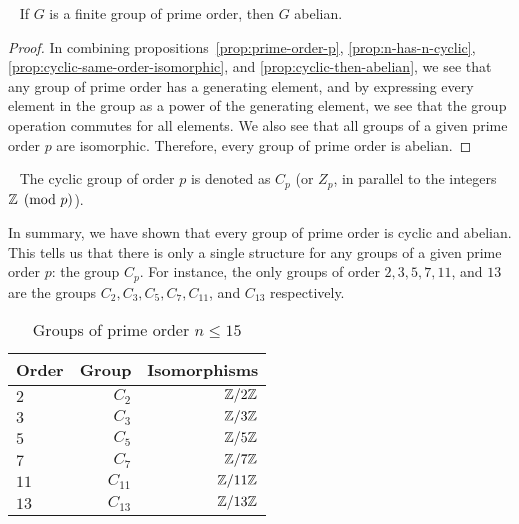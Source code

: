 \begin{corollary}~\label{cor:prime-then-abelian}
  If $G$ is a finite group of prime order, then $G$ abelian.
  \begin{proof}
    In combining propositions~\ref{prop:prime-order-p}, \ref{prop:n-has-n-cyclic},
    \ref{prop:cyclic-same-order-isomorphic}, and \ref{prop:cyclic-then-abelian},
    we see that any group of prime order has a generating element,
    and by expressing every element in the group as a power of the generating element,
    we see that the group operation commutes for all elements.
    We also see that all groups of a given prime order $p$ are isomorphic.
    Therefore, every group of prime order is abelian.
  \end{proof}
\end{corollary}

\begin{definition}~\label{def:C_n}
  The cyclic group of order $p$ is denoted as $C_p$ (or $Z_p$,
  in parallel to the integers $\mathbb{Z} \pmod p$).
\end{definition}

In summary, we have shown that every group of prime order is
cyclic and abelian. This tells us that there is only a single
structure for any groups of a given prime order $p$: the group $C_p$.
For instance, the only groups of order $2, 3, 5, 7, 11$, and $13$
are the groups $C_2, C_3, C_5, C_7, C_{11}$, and $C_{13}$ respectively.

\bigskip

\begin{center}
  \begin{table}[H]
    \begin{tabular}{ l r r }
      Order & Group & Isomorphisms \\
      \midrule
      $2$ & $C_2$ & $\mathbb{Z}/2\mathbb{Z}$ \\
      $3$ & $C_3$ & $\mathbb{Z}/3\mathbb{Z}$ \\
      $5$ & $C_5$ & $\mathbb{Z}/5\mathbb{Z}$ \\
      $7$ & $C_7$ & $\mathbb{Z}/7\mathbb{Z}$ \\
      $11$ & $C_{11}$ & $\mathbb{Z}/11\mathbb{Z}$ \\
      $13$ & $C_{13}$ & $\mathbb{Z}/13\mathbb{Z}$ \\
    \end{tabular}
    \caption{Groups of prime order $n \le 15$}~\label{tab:prime-groups}
  \end{table}
\end{center}

